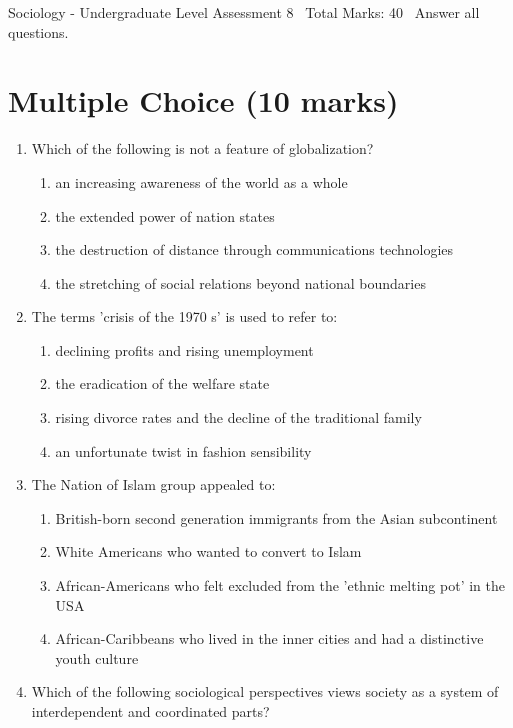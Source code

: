 \documentclass[12pt]{article}
\begin{document}
\begin{center}
Sociology - Undergraduate Level Assessment 8 \
Total Marks: 40 \
Answer all questions.
\end{center}

\section*{Multiple Choice (10 marks)}
\begin{enumerate}[label=\arabic*.]
\item Which of the following is not a feature of globalization?
\begin{enumerate}[label=(\alph*)]
    \item an increasing awareness of the world as a whole
    \item the extended power of nation states
    \item the destruction of distance through communications technologies
    \item the stretching of social relations beyond national boundaries
\end{enumerate}
\item The terms 'crisis of the 1970 s' is used to refer to:
\begin{enumerate}[label=(\alph*)]
    \item declining profits and rising unemployment
    \item the eradication of the welfare state
    \item rising divorce rates and the decline of the traditional family
    \item an unfortunate twist in fashion sensibility
\end{enumerate}
\item The Nation of Islam group appealed to:
\begin{enumerate}[label=(\alph*)]
    \item British-born second generation immigrants from the Asian subcontinent
    \item White Americans who wanted to convert to Islam
    \item African-Americans who felt excluded from the 'ethnic melting pot' in the USA
    \item African-Caribbeans who lived in the inner cities and had a distinctive youth culture
\end{enumerate}
\item Which of the following sociological perspectives views society as a system of interdependent and coordinated parts?

\end{enumerate}
\end{document}
